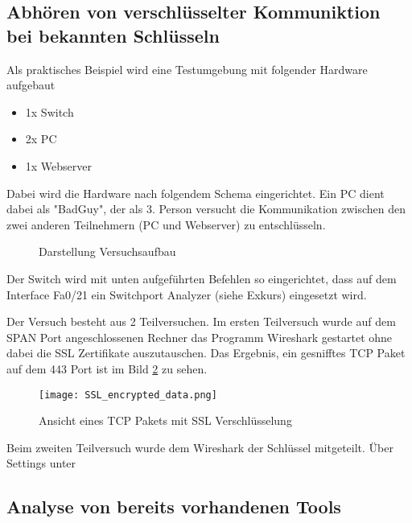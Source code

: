 	\subsection{Abhören von verschlüsselter Kommuniktion bei bekannten Schlüsseln}
	Als praktisches Beispiel wird eine Testumgebung mit folgender Hardware aufgebaut
	\begin{itemize}
		\item 1x Switch
		\item 2x PC
		\item 1x Webserver
	\end{itemize}
	Dabei wird die Hardware nach folgendem Schema eingerichtet. Ein PC dient dabei als "BadGuy", der als 3. Person versucht
	die Kommunikation zwischen den zwei anderen Teilnehmern (PC und Webserver) zu entschlüsseln.
	\begin{figure}[H]
		\centering
		\caption{Darstellung Versuchsaufbau}
		\label{fig:versuchsaufbau}
	\end{figure}
	Der Switch wird mit unten aufgeführten Befehlen so eingerichtet, dass auf dem Interface Fa0/21 ein Switchport Analyzer (siehe Exkurs) eingesetzt wird.
		
	Der Versuch besteht aus 2 Teilversuchen. Im ersten Teilversuch wurde auf dem SPAN Port angeschlossenen Rechner das Programm Wireshark gestartet ohne dabei die SSL Zertifikate auszutauschen. Das Ergebnis, ein gesnifftes TCP Paket auf dem 443 Port ist im Bild \ref{fig:ssl_encrypted_data} zu sehen.
	\begin{figure}[H]
		\centering
		\texttt{[image: SSL\_encrypted\_data.png]}
		\caption{Ansicht eines TCP Pakets mit SSL Verschlüsselung}
		\label{fig:ssl_encrypted_data}
	\end{figure}
	
	Beim zweiten Teilversuch wurde dem Wireshark der Schlüssel mitgeteilt. Über Settings unter 
	\subsection{Analyse von bereits vorhandenen Tools} %